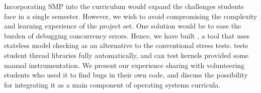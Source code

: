 Incorporating SMP into the \fourten curriculum would expand the challenges students face in a single semester.
However, we wish to avoid compromising the complexity
and learning experience of the project set.
One solution would be to ease the burden of debugging concurrency errors.
Hence, we have built \landslide%
, a tool that uses stateless model checking \cite{verisoft,dpor,chess}
as an alternative to the conventional stress tests.
\landslide tests student thread libraries fully automatically, and can test kernels provided some manual instrumentation.
We present our experience sharing \landslide with volunteering students who used it to find bugs in their own code,
and discuss the possibility for integrating it as a main component of operating systems curricula.


